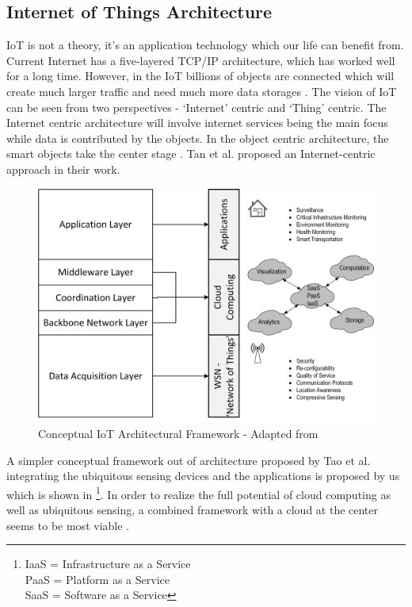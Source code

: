 {\subsection{Internet of Things Architecture}
\acs{IoT} is not a theory, it's an application technology which our life can benefit from. Current Internet has a five-layered \acs{TCP}/\acs{IP} architecture, which has worked well for a long time. However, in the \acs{IoT} billions of objects are connected which will create much larger traffic and need much more data storages \cite{IOTFUTURE}. The vision of \acs{IoT} can be seen from two perspectives - ‘Internet’ centric and ‘Thing’ centric. The Internet centric architecture will involve internet services being the main focus while data is contributed by the objects. In the object centric architecture, the smart objects take the center stage \cite{IOTGUBBI}. Tan et al. \cite{IOTFUTURE} proposed an Internet-centric approach in their work.
\begin{figure}[h!]
	\includegraphics[scale=0.5]{./gfx/iotarch}
	\centering
	\caption{Conceptual \acs{IoT} Architectural Framework - Adapted from \cite{IOTFUTURE,IOTGUBBI}}
	\label{fig:2.8}
\end{figure}

A simpler conceptual framework out of architecture proposed by Tao et al. \cite{IOTFUTURE} integrating the ubiquitous sensing devices and the applications is proposed by us which is shown in  \footnote{\acs{IaaS} = Infrastructure as a Service\\\acs{PaaS} = Platform as a Service\\\acs{SaaS} = Software as a Service}. In order to realize the full potential of cloud computing as well as ubiquitous sensing, a combined framework with a cloud at the center seems to be most viable \cite{IOTGUBBI}. 

}
